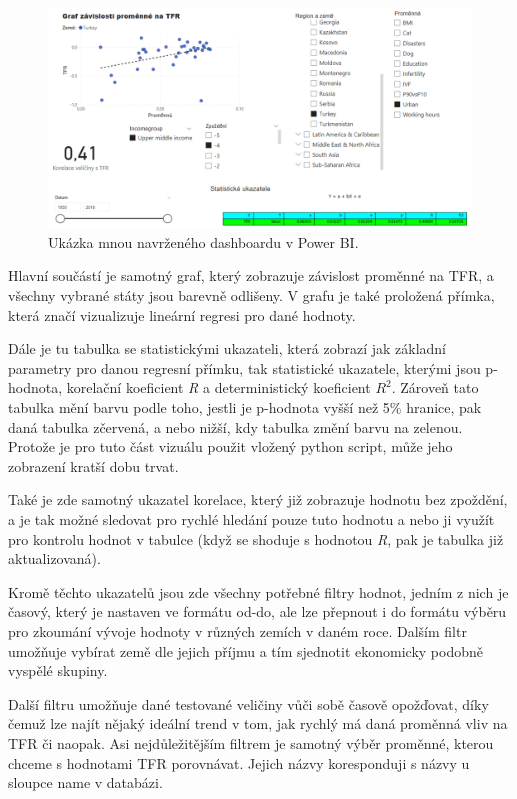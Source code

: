 \documentclass[thesis=M,czech]{FITthesis}[2022/10/08]
\begin{document}
\begin{figure}[h]
    \centering
    \includegraphics[width=\textwidth]{DP-obrazky/dashboard_mine.png}
    \caption{Ukázka mnou navrženého dashboardu v Power BI.}
    \label{fig:Muj_dashboard}
\end{figure}

Hlavní součástí je samotný graf, který zobrazuje závislost proměnné na TFR, a všechny vybrané státy jsou barevně odlišeny. V grafu je také proložená přímka, která značí vizualizuje lineární regresi pro dané hodnoty.

Dále je tu tabulka se statistickými ukazateli, která zobrazí jak základní parametry pro danou regresní přímku, tak statistické ukazatele, kterými jsou p-hodnota, korelační koeficient \textit{R} a deterministický koeficient $R^2$. Zároveň tato tabulka mění barvu podle toho, jestli je p-hodnota vyšší než 5\% hranice, pak daná tabulka zčervená, a nebo nižší, kdy tabulka změní barvu na zelenou. Protože je pro tuto část vizuálu použit vložený python script, může jeho zobrazení kratší dobu trvat.

Také je zde samotný ukazatel korelace, který již zobrazuje hodnotu bez zpoždění, a je tak možné sledovat pro rychlé hledání pouze tuto hodnotu a nebo ji využít pro kontrolu hodnot v tabulce (když se shoduje s hodnotou \textit{R}, pak je tabulka již aktualizovaná).

Kromě těchto ukazatelů jsou zde všechny potřebné filtry hodnot, jedním z nich je časový, který je nastaven ve formátu od-do, ale lze přepnout i do formátu výběru pro zkoumání vývoje hodnoty v různých zemích v daném roce. Dalším filtr umožňuje vybírat země dle jejich příjmu a tím sjednotit ekonomicky podobně vyspělé skupiny.

Další filtru umožňuje dané testované veličiny vůči sobě časově opožďovat, díky čemuž lze najít nějaký ideální trend v tom, jak rychlý má daná proměnná vliv na TFR či naopak. Asi nejdůležitějším filtrem je samotný výběr proměnné, kterou chceme s hodnotami TFR porovnávat. Jejich názvy koresponduji s názvy u sloupce name v databázi.
\end{document}
